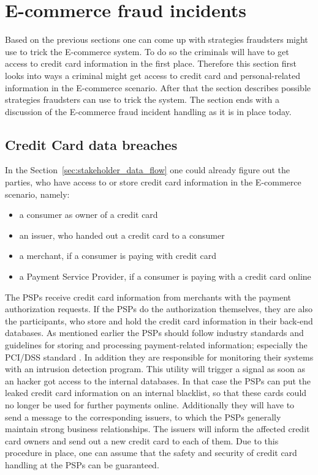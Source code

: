 
\section{\gls{E-commerce} fraud incidents}
\label{sec:scenario_fraud}

Based on the previous sections one can come up with strategies fraudsters might use to trick the \gls{E-commerce} system. To do so the criminals will have to get access to credit card information in the first place. Therefore this section first looks into ways a criminal might get access to credit card and personal-related information in the \gls{E-commerce} scenario. After that the section describes possible strategies fraudsters can use to trick the system. The section ends with a discussion of the \gls{E-commerce} fraud incident handling as it is in place today.

\subsection{Credit Card data breaches}
\label{subsec:leaking_credit_cards}

 In the Section~\ref{sec:stakeholder_data_flow} one could already figure out the parties, who have access to or store credit card information in the \gls{E-commerce} scenario, namely:\@

\begin{itemize}
  \item a consumer as owner of a credit card
  \item an issuer, who handed out a credit card to a consumer
  \item a merchant, if a consumer is paying with credit card
  \item a Payment Service Provider, if a consumer is paying with a credit card online
\end{itemize}

The \gls{PSP}s receive credit card information from merchants with the payment authorization requests. If the \gls{PSP}s do the authorization themselves, they are also the participants, who store and hold the credit card information in their back-end databases. As mentioned earlier the \gls{PSP}s should follow industry standards and guidelines for storing and processing payment-related information; especially the \gls{PCI/DSS} standard \citep{virtue2009payment}. In addition they are responsible for monitoring their systems with an intrusion detection program. This utility will trigger a signal as soon as an hacker got access to the internal databases. In that case the \gls{PSP}s can put the leaked credit card information on an internal blacklist, so that these cards could no longer be used for further payments online. Additionally they will have to send a message to the corresponding issuers, to which the \gls{PSP}s generally maintain strong business relationships. The issuers will inform the affected credit card owners and send out a new credit card to each of them. Due to this procedure in place, one can assume that the safety and security of credit card handling at the \gls{PSP}s can be guaranteed. \\

